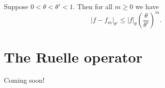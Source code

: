 \begin{proposition}
	Suppose $0 < \theta < \theta' < 1$. Then for all $m \geq 0$ we have
	\begin{equation*}
		|f - f_m|_{\theta'} \leq |f|_\theta \left(\frac{\theta}{\theta'}\right)^m.
	\end{equation*}
\end{proposition}

\section{The Ruelle operator}
\begin{theorem}
	Coming soon!
\end{theorem}
